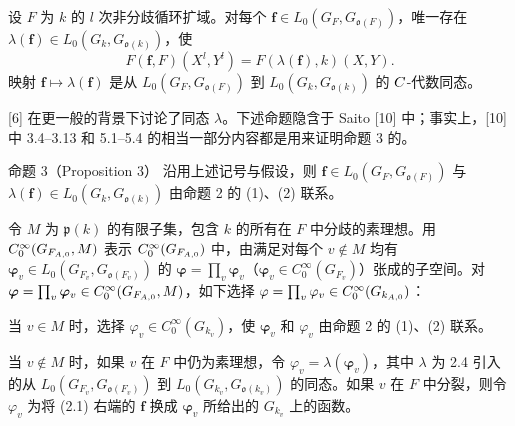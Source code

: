 设 $F$ 为 $k$ 的 $l$ 次非分歧循环扩域。对每个 $\boldsymbol f\in L_0(G_F,G_{\mathfrak o(F)})$，唯一存在 $\lambda(\boldsymbol f)\in L_0(G_k,G_{\mathfrak o(k)})$，使
\[
 F(\boldsymbol f,F)(X^l,Y^l)=F(\lambda(\boldsymbol f),k)(X,Y).
\]
映射 $\boldsymbol f\mapsto\lambda(\boldsymbol f)$ 是从 $L_0(G_F,G_{\mathfrak o(F)})$ 到 $L_0(G_k,G_{\mathfrak o(k)})$ 的 $C$-代数同态。

[6] 在更一般的背景下讨论了同态 $\lambda$。下述命题隐含于 Saito [10] 中；事实上，[10] 中 3.4--3.13 和 5.1--5.4 的相当一部分内容都是用来证明命题 3 的。

\begin{originaltheorem}{命题 3（Proposition 3）}
沿用上述记号与假设，则 $\boldsymbol f\in L_0(G_F,G_{\mathfrak o(F)})$ 与 $\lambda(\boldsymbol f)\in L_0(G_k,G_{\mathfrak o(k)})$ 由命题 2 的 (1)、(2) 联系。
\end{originaltheorem}

令 $M$ 为 $\mathfrak p(k)$ 的有限子集，包含 $k$ 的所有在 $F$ 中分歧的素理想。用 $C_0^\infty(G_{F_{A,0}},M)$ 表示 $C_0^\infty(G_{F_{A,0}})$ 中，由满足对每个 $v\notin M$ 均有 $\boldsymbol\varphi_v\in L_0(G_{F_v},G_{\mathfrak o(F_v)})$ 的 $\boldsymbol\varphi=\prod_v\boldsymbol\varphi_v$（$\boldsymbol\varphi_v\in C_0^\infty(G_{F_v})$）张成的子空间。对 $\boldsymbol\varphi=\prod_v\boldsymbol\varphi_v\in C_0^\infty(G_{F_{A,0}},M)$，如下选择 $\varphi=\prod_v\varphi_v\in C_0^\infty(G_{k_{A,0}})$：

当 $v\in M$ 时，选择 $\varphi_v\in C_0^\infty(G_{k_v})$，使 $\boldsymbol\varphi_v$ 和 $\varphi_v$ 由命题 2 的 (1)、(2) 联系。

当 $v\notin M$ 时，如果 $v$ 在 $F$ 中仍为素理想，令 $\varphi_v=\lambda(\boldsymbol\varphi_v)$，其中 $\lambda$ 为 2.4 引入的从 $L_0(G_{F_v},G_{\mathfrak o(F_v)})$ 到 $L_0(G_{k_v},G_{\mathfrak o(k_v)})$ 的同态。如果 $v$ 在 $F$ 中分裂，则令 $\varphi_v$ 为将 (2.1) 右端的 $\boldsymbol f$ 换成 $\boldsymbol\varphi_v$ 所给出的 $G_{k_v}$ 上的函数。


